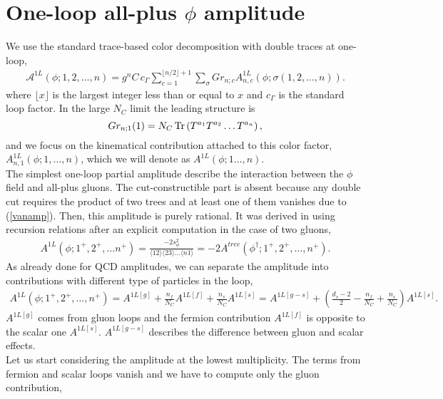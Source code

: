 \section{One-loop all-plus $\phi$ amplitude}
We use the standard trace-based color decomposition with double traces at one-loop,
\begin{align}
	\mathcal{A}^{1L}(\phi;1,2,\dots,n)=g^nC\,c_\Gamma \sum_{c=1}^{\lfloor n/2 \rfloor+1} \sum_\sigma Gr_{n;c} A^{1L}_{n,c}\left(\phi;\sigma(1,2,\dots,n)\right).	\label{phidec1l}
\end{align}
where $\lfloor x \rfloor$ is the largest integer less than or equal to $x$ and $c_\Gamma$ is the standard loop factor. In the large $N_C$ limit the leading structure is
$$
	Gr_{n;1}(1)=N_C \Tr\left(T^{a_1}T^{a_2}\dots T^{a_n}\right),
$$
and we focus on the kinematical contribution attached to this color factor, $A^{1L}_{n,1}(\phi;1,\dots,n)$, which we will denote as $A^{1L}(\phi;1\dots, n)$.\\
The simplest one-loop partial amplitude describe the interaction between the $\phi$ field and all-plus gluons. The cut-constructible part is absent because any double cut requires the product of two trees and at least one of them vanishes due to (\ref{vanamp}). Then, this amplitude is purely rational. It was derived in \cite{Berger:2006sh} using recursion relations after an explicit computation in the case of two gluons,
\begin{align}
	A^{1L}(\phi;1^+,2^+,\dots n^+)=\frac{-2s_\phi^2}{\langle 12 \rangle \langle 23 \rangle \dots \langle n1 \rangle} =-2 A^{tree}(\phi^\dagger;1^+,2^+,\dots,n^+).	\label{1Lphi}
\end{align}
As already done for QCD amplitudes, we can separate the amplitude into contributions with different type of particles in the loop,
\begin{align}
	A^{1L}(\phi;1^+,2^+,\dots,n^+)=A^{1L[g]}+\frac{n_f}{N_C} A^{1L[f]}+\frac{n_s}{N_C} A^{1L[s]}=A^{1L[g-s]}+\left(\frac{d_s-2}{2}-\frac{n_f}{N_C}+\frac{n_s}{N_C}\right) A^{1L[s]}.
\end{align}
$A^{1L[g]}$ comes from gluon loops and the fermion contribution $A^{1L[f]}$ is opposite to the scalar one $A^{1L[s]}$. $A^{1L[g-s]}$ describes the difference between gluon and scalar effects.\\
Let us start considering the amplitude at the lowest multiplicity. The terms from fermion and scalar loops vanish and we have to compute only the gluon contribution,
